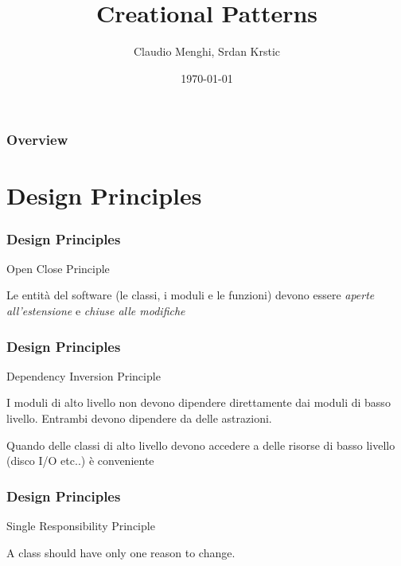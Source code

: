 \documentclass{beamer}
\title[Introduzione]{Creational Patterns} %
\author{Claudio Menghi,  Srdan Krstic} %
\institute[Deepse group] %
{
Politecnico di Milano \\ %
\medskip
\textit{menghi@elet.polimi.it,  srdan.krstic@polimi.it} %
}
\date{\today} %
\begin{document}
\begin{frame}
\titlepage %
\end{frame}


\begin{frame}
\frametitle{Overview} %
\tableofcontents %
\end{frame}


\section{Design Principles}



\begin{frame}
\frametitle{Design Principles}
Open Close Principle
\begin{framed}
Le entit\`a del software (le classi, i moduli e le funzioni) devono essere \emph{aperte all'estensione} e \emph{chiuse alle modifiche}\\
\end{framed}
\end{frame}

\begin{frame}
\frametitle{Design Principles}
Dependency Inversion Principle
\begin{framed}
I moduli di alto livello non devono dipendere direttamente dai moduli di basso livello. Entrambi devono dipendere da delle astrazioni.
\end{framed}
Quando delle classi di alto livello devono accedere a delle risorse di basso livello (disco I/O etc..) \`e conveniente
\end{frame}


\begin{frame}
\frametitle{Design Principles}
Single Responsibility Principle
\begin{framed}
A class should have only one reason to change.
\end{framed}
\end{frame}
\end{document}
